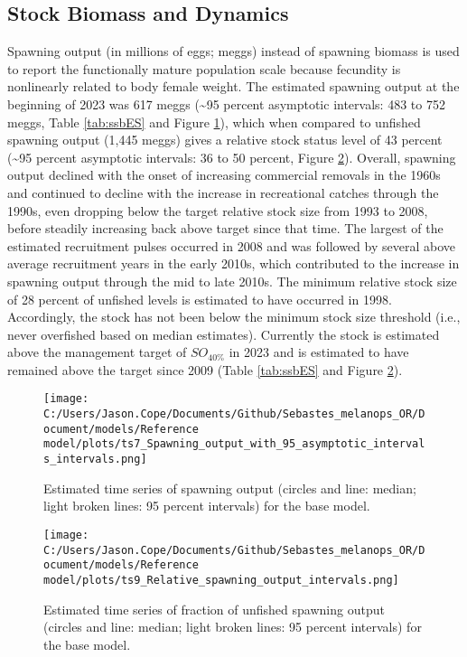 \documentclass[11pt,
  english,
  letterpaper,
]{article}
\begin{document}
\hypertarget{stock-biomass-and-dynamics}{%
\subsection*{Stock Biomass and Dynamics}\label{stock-biomass-and-dynamics}}

Spawning output (in millions of eggs; meggs) instead of spawning biomass is used to report the functionally mature population scale because fecundity is nonlinearly related to body female weight. The estimated spawning output at the beginning of 2023 was 617 meggs (\textasciitilde95 percent asymptotic intervals: 483 to 752 meggs, Table \ref{tab:ssbES} and Figure \ref{fig:es-ssb}), which when compared to unfished spawning output (1,445 meggs) gives a relative stock status level of 43 percent (\textasciitilde95 percent asymptotic intervals: 36 to 50 percent, Figure \ref{fig:es-depl}). Overall, spawning output declined with the onset of increasing commercial removals in the 1960s and continued to decline with the increase in recreational catches through the 1990s, even dropping below the target relative stock size from 1993 to 2008, before steadily increasing back above target since that time. The largest of the estimated recruitment pulses occurred in 2008 and was followed by several above average recruitment years in the early 2010s, which contributed to the increase in spawning output through the mid to late 2010s. The minimum relative stock size of 28 percent of unfished levels is estimated to have occurred in 1998. Accordingly, the stock has not been below the minimum stock size threshold (i.e., never overfished based on median estimates). Currently the stock is estimated above the management target of \(SO_{40\%}\) in 2023 and is estimated to have remained above the target since 2009 (Table \ref{tab:ssbES} and Figure \ref{fig:es-depl}).



\begin{figure}
\centering
\texttt{[image: C:/Users/Jason.Cope/Documents/Github/Sebastes\_melanops\_OR/Document/models/Reference model/plots/ts7\_Spawning\_output\_with\_95\_asymptotic\_intervals\_intervals.png]}
\caption{Estimated time series of spawning output (circles and line: median; light broken lines: 95 percent intervals) for the base model.\label{fig:es-ssb}}
\end{figure}

\begin{figure}
\centering
\texttt{[image: C:/Users/Jason.Cope/Documents/Github/Sebastes\_melanops\_OR/Document/models/Reference model/plots/ts9\_Relative\_spawning\_output\_intervals.png]}
\caption{Estimated time series of fraction of unfished spawning output (circles and line: median; light broken lines: 95 percent intervals) for the base model.\label{fig:es-depl}}
\end{figure}
\end{document}
